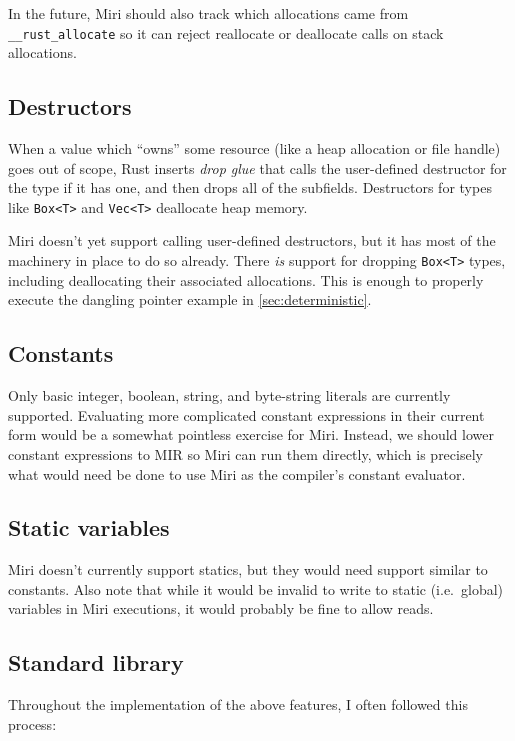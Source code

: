 \documentclass[twocolumn]{article}
\newcommand{\rust}[1]{\texttt{#1}}
\begin{document}
In the future, Miri should also track which allocations came from \rust{__rust_allocate} so it can
reject reallocate or deallocate calls on stack allocations.

\subsection{Destructors}

When a value which ``owns'' some resource (like a heap allocation or file handle) goes out of scope,
Rust inserts \emph{drop glue} that calls the user-defined destructor for the type if it has one, and
then drops all of the subfields. Destructors for types like \rust{Box<T>} and \rust{Vec<T>}
deallocate heap memory.

Miri doesn't yet support calling user-defined destructors, but it has most of the machinery in place
to do so already. There \emph{is} support for dropping \rust{Box<T>} types, including deallocating
their associated allocations. This is enough to properly execute the dangling pointer example in
\autoref{sec:deterministic}.

\subsection{Constants}

Only basic integer, boolean, string, and byte-string literals are currently supported. Evaluating
more complicated constant expressions in their current form would be a somewhat pointless exercise
for Miri. Instead, we should lower constant expressions to MIR so Miri can run them directly, which
is precisely what would need be done to use Miri as the compiler's constant evaluator.

\subsection{Static variables}

Miri doesn't currently support statics, but they would need support similar to constants. Also note
that while it would be invalid to write to static (i.e.\ global) variables in Miri executions, it
would probably be fine to allow reads.

\subsection{Standard library}

Throughout the implementation of the above features, I often followed this process:
\end{document}
